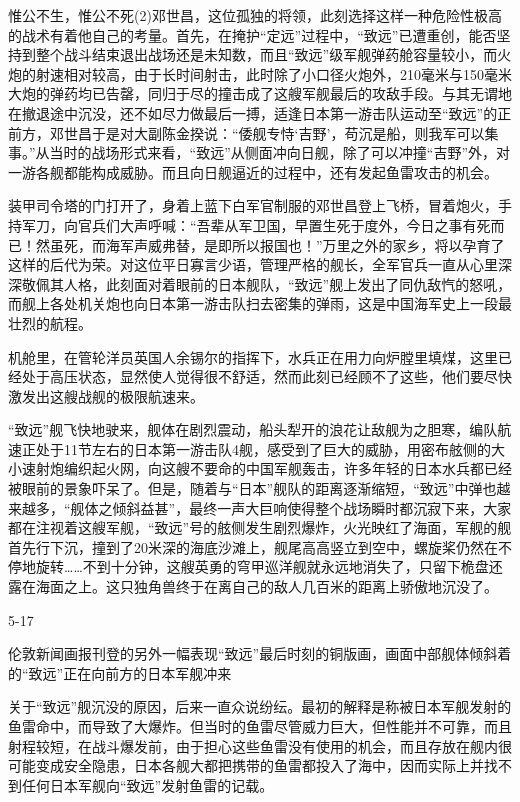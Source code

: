 \documentclass[12pt,UTF8]{ctexbook}
\begin{document}
惟公不生，惟公不死(2)邓世昌，这位孤独的将领，此刻选择这样一种危险性极高的战术有着他自己的考量。首先，在掩护“定远”过程中，“致远”已遭重创，能否坚持到整个战斗结束退出战场还是未知数，而且“致远”级军舰弹药舱容量较小，而火炮的射速相对较高，由于长时间射击，此时除了小口径火炮外，210毫米与150毫米大炮的弹药均已告罄，同归于尽的撞击成了这艘军舰最后的攻敌手段。与其无谓地在撤退途中沉没，还不如尽力做最后一搏，适逢日本第一游击队运动至“致远”的正前方，邓世昌于是对大副陈金揆说：“倭舰专恃‘吉野’，苟沉是船，则我军可以集事。”从当时的战场形式来看，“致远”从侧面冲向日舰，除了可以冲撞“吉野”外，对一游各舰都能构成威胁。而且向日舰逼近的过程中，还有发起鱼雷攻击的机会。

装甲司令塔的门打开了，身着上蓝下白军官制服的邓世昌登上飞桥，冒着炮火，手持军刀，向官兵们大声呼喊：“吾辈从军卫国，早置生死于度外，今日之事有死而已！然虽死，而海军声威弗替，是即所以报国也！”万里之外的家乡，将以孕育了这样的后代为荣。对这位平日寡言少语，管理严格的舰长，全军官兵一直从心里深深敬佩其人格，此刻面对着眼前的日本舰队，“致远”舰上发出了同仇敌忾的怒吼，而舰上各处机关炮也向日本第一游击队扫去密集的弹雨，这是中国海军史上一段最壮烈的航程。

机舱里，在管轮洋员英国人余锡尔的指挥下，水兵正在用力向炉膛里填煤，这里已经处于高压状态，显然使人觉得很不舒适，然而此刻已经顾不了这些，他们要尽快激发出这艘战舰的极限航速来。

“致远”舰飞快地驶来，舰体在剧烈震动，船头犁开的浪花让敌舰为之胆寒，编队航速正处于11节左右的日本第一游击队4舰，感受到了巨大的威胁，用密布舷侧的大小速射炮编织起火网，向这艘不要命的中国军舰轰击，许多年轻的日本水兵都已经被眼前的景象吓呆了。但是，随着与“日本”舰队的距离逐渐缩短，“致远”中弹也越来越多，“舰体之倾斜益甚”，最终一声大巨响使得整个战场瞬时都沉寂下来，大家都在注视着这艘军舰，“致远”号的舷侧发生剧烈爆炸，火光映红了海面，军舰的舰首先行下沉，撞到了20米深的海底沙滩上，舰尾高高竖立到空中，螺旋桨仍然在不停地旋转……不到十分钟，这艘英勇的穹甲巡洋舰就永远地消失了，只留下桅盘还露在海面之上。这只独角兽终于在离自己的敌人几百米的距离上骄傲地沉没了。

5-17

伦敦新闻画报刊登的另外一幅表现“致远”最后时刻的铜版画，画面中部舰体倾斜着的“致远”正在向前方的日本军舰冲来

关于“致远”舰沉没的原因，后来一直众说纷纭。最初的解释是称被日本军舰发射的鱼雷命中，而导致了大爆炸。但当时的鱼雷尽管威力巨大，但性能并不可靠，而且射程较短，在战斗爆发前，由于担心这些鱼雷没有使用的机会，而且存放在舰内很可能变成安全隐患，日本各舰大都把携带的鱼雷都投入了海中，因而实际上并找不到任何日本军舰向“致远”发射鱼雷的记载。
\end{document}
